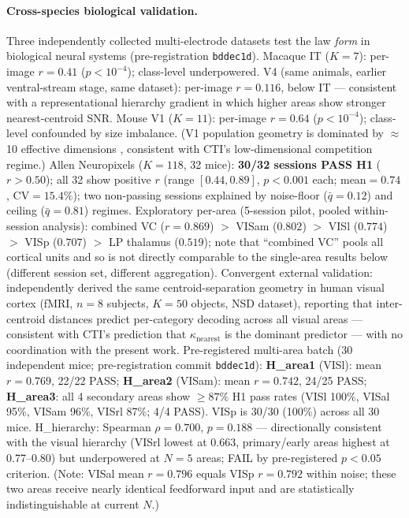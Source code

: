 \documentclass{article}
\begin{document}
\paragraph{Cross-species biological validation.}
Three independently collected multi-electrode datasets test the law \emph{form} in biological neural systems (pre-registration \texttt{bddec1d}).
Macaque IT \citep{cadieu2014deep} ($K=7$): per-image $r=0.41$ ($p<10^{-4}$); class-level underpowered. V4 (same animals, earlier ventral-stream stage, same dataset): per-image $r=0.116$, below IT --- consistent with a representational hierarchy gradient in which higher areas show stronger nearest-centroid SNR.
Mouse V1 \citep{stringer2018spontaneous} ($K=11$): per-image $r=0.64$ ($p<10^{-4}$); class-level confounded by size imbalance. (V1 population geometry is dominated by $\approx$10 effective dimensions \citep{pospisil2025}, consistent with CTI's low-dimensional competition regime.)
Allen Neuropixels \citep{siegle2021survey} ($K=118$, 32 mice): \textbf{30/32 sessions PASS H1} ($r>0.50$); all 32 show positive $r$ (range $[0.44, 0.89]$, $p<0.001$ each; mean$=0.74$, CV$=15.4\%$); two non-passing sessions explained by noise-floor ($\bar{q}=0.12$) and ceiling ($\bar{q}=0.81$) regimes.
Exploratory per-area (5-session pilot, pooled within-session analysis): combined VC ($r=0.869$) $>$ VISam ($0.802$) $>$ VISl ($0.774$) $>$ VISp ($0.707$) $>$ LP thalamus ($0.519$); note that ``combined VC'' pools all cortical units and so is not directly comparable to the single-area results below (different session set, different aggregation).
Convergent external validation: \citet{styves2025} independently derived the same centroid-separation geometry in human visual cortex (fMRI, $n=8$ subjects, $K=50$ objects, NSD dataset), reporting that inter-centroid distances predict per-category decoding across all visual areas --- consistent with CTI's prediction that $\kappa_\mathrm{nearest}$ is the dominant predictor --- with no coordination with the present work.
Pre-registered multi-area batch (30 independent mice; pre-registration commit \texttt{bddec1d}): \textbf{H\_area1} (VISl): mean $r{=}0.769$, 22/22 PASS; \textbf{H\_area2} (VISam): mean $r{=}0.742$, 24/25 PASS; \textbf{H\_area3}: all 4 secondary areas show $\geq{87}\%$ H1 pass rates (VISl 100\%, VISal 95\%, VISam 96\%, VISrl 87\%; 4/4 PASS). VISp is 30/30 (100\%) across all 30 mice. H\_hierarchy: Spearman $\rho{=}0.700$, $p{=}0.188$ --- directionally consistent with the visual hierarchy (VISrl lowest at 0.663, primary/early areas highest at 0.77--0.80) but underpowered at $N{=}5$ areas; FAIL by pre-registered $p{<}0.05$ criterion. (Note: VISal mean $r=0.796$ equals VISp $r=0.792$ within noise; these two areas receive nearly identical feedforward input and are statistically indistinguishable at current $N$.)
\end{document}
